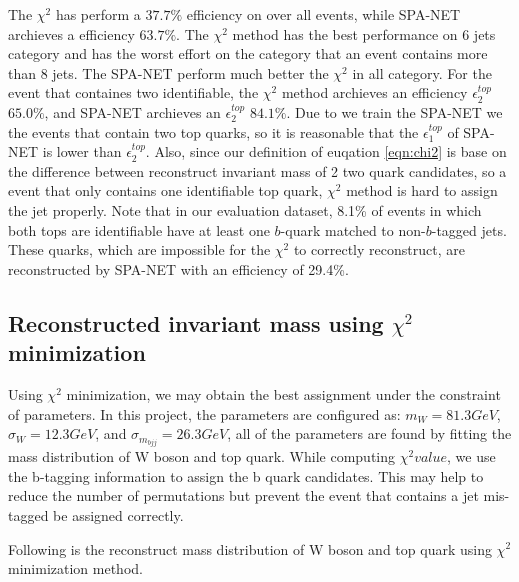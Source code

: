 The $\chi^{2}$ has perform a $37.7\%$ efficiency on over all events, while SPA-NET archieves a efficiency $63.7\%$. The $\chi^{2}$ method has the best performance on 6 jets category and has the worst effort on the category that an event contains more than 8 jets. The SPA-NET perform much better the $\chi^{2}$ in all category. For the event that containes two identifiable, the $\chi^{2}$ method archieves an efficiency $\epsilon^{top}_{2}$ $65.0\%$, and SPA-NET archieves an $\epsilon^{top}_{2}$ $84.1\%$. Due to we train the SPA-NET we the events that contain two top quarks, so it is reasonable that the $\epsilon^{top}_{1}$ of SPA-NET is lower than $\epsilon^{top}_{2}$. Also, since our definition of euqation \ref{eqn:chi2} is base on the difference between reconstruct invariant mass of 2 two quark candidates, so a event that only contains one identifiable top quark, $\chi^{2}$ method is hard to assign the jet properly. Note that in our evaluation dataset, 8.1\% of events in which both tops are identifiable have at least one $b$-quark matched to non-$b$-tagged jets. These quarks, which are impossible for the $\chi^2$ to correctly reconstruct, are reconstructed by SPA-NET with an efficiency of 29.4\%. 

\subsection{Reconstructed invariant mass using $\chi^{2}$ minimization}\label{subsec:reco inv mass chi2}

Using $\chi^{2}$ minimization, we may obtain the best assignment under the constraint of parameters. In this project, the parameters are configured as: $m_{W}=81.3GeV$, $\sigma_{W} = 12.3GeV$, and $\sigma_{m_{bjj}}=26.3GeV$, all of the parameters are found by fitting the mass distribution of W boson and top quark. While computing $\chi^{2} value$, we use the b-tagging information to assign the b quark candidates. This may help to reduce the number of permutations but prevent the event that contains a jet mis-tagged be assigned correctly.

Following is the reconstruct mass distribution of W boson and top quark using $\chi^{2}$ minimization method.

